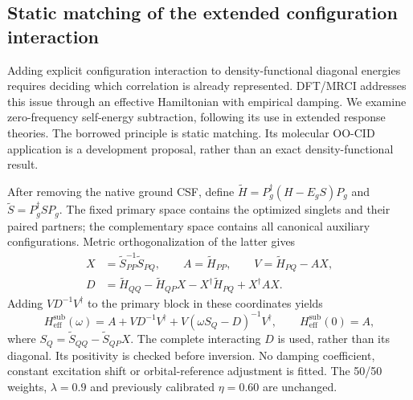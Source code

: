 \documentclass[11pt,a4paper]{article}
\begin{document}
\subsection{Static matching of the extended configuration interaction}
Adding explicit configuration interaction to density-functional diagonal
energies requires deciding which correlation is already represented.
DFT/MRCI addresses this
issue through an effective Hamiltonian with empirical damping.\cite{marian2019mrci}
We examine zero-frequency self-energy subtraction, following its use in
extended response theories.\cite{tselyaev2013,gambacurta2015}
The borrowed principle is static matching. Its molecular OO-CID application
is a development proposal, rather than an exact density-functional result.

After removing the native ground CSF, define
$\widetilde H=P_g^\dagger(H-E_gS)P_g$ and
$\widetilde S=P_g^\dagger SP_g$. The fixed primary space contains the
optimized singlets and their paired partners; the complementary space
contains all canonical auxiliary configurations. Metric orthogonalization
of the latter gives
\begin{align}
 X&=\widetilde S_{PP}^{-1}\widetilde S_{PQ},\qquad
 A=\widetilde H_{PP},\qquad V=\widetilde H_{PQ}-AX,\\
 D&=\widetilde H_{QQ}-\widetilde H_{QP}X
       -X^\dagger\widetilde H_{PQ}+X^\dagger AX.
\end{align}
Adding $VD^{-1}V^\dagger$ to the primary block in these coordinates yields
\begin{equation}
 H_{\mathrm{eff}}^{\mathrm{sub}}(\omega)
 =A+VD^{-1}V^\dagger+V(\omega S_Q-D)^{-1}V^\dagger,
 \qquad H_{\mathrm{eff}}^{\mathrm{sub}}(0)=A ,
\end{equation}
where $S_Q=\widetilde S_{QQ}-\widetilde S_{QP}X$.
The complete interacting $D$ is used, rather than its diagonal. Its
positivity is checked before inversion. No damping coefficient, constant
excitation shift or orbital-reference adjustment is fitted. The 50/50
weights, $\lambda=0.9$ and previously calibrated $\eta=0.60$ are unchanged.
\end{document}
